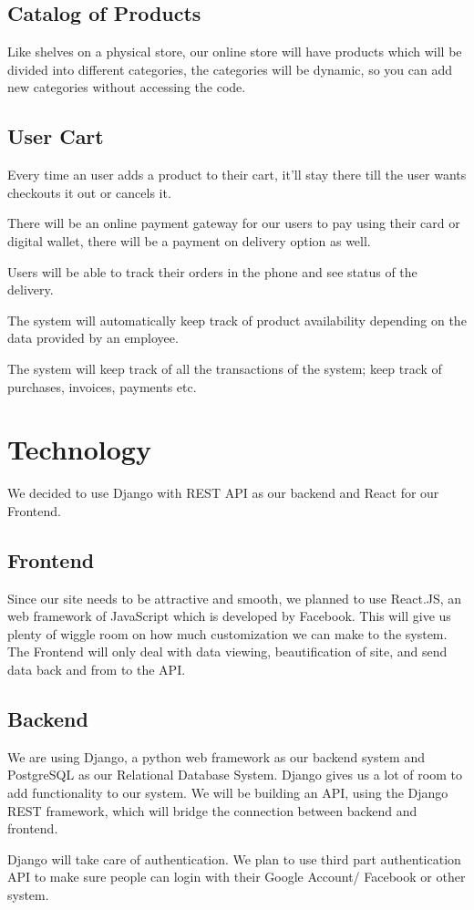 \documentclass[12pt]{article}
\begin{document}
\subsection{Catalog of Products}
Like shelves on a physical store, our online store will have products which will be divided into different categories, the categories will be dynamic, so you can add new categories without accessing the code.

\subsection{User Cart}
Every time an user adds a product to their cart, it'll stay there till the user wants checkouts it out or cancels it.

There will be an online payment gateway for our users to pay using their card or digital wallet, there will be a payment on delivery option as well.

Users will be able to track their orders in the phone and see status of the delivery.

The system will automatically keep track of product availability depending on the data provided by an employee.

The system will keep track of all the transactions of the system; keep track of purchases, invoices, payments etc.

\section{Technology}
We decided to use Django with REST API as our backend and React for our Frontend.

\subsection{Frontend}
Since our site needs to be attractive and smooth, we planned to use React.JS, an web framework of JavaScript which is developed by Facebook. This will give us plenty of wiggle room on how much customization we can make to the system. The Frontend will only deal with data viewing, beautification of site, and send data back and from to the API.

\subsection{Backend}
We are using Django, a python web framework as our backend system and PostgreSQL as our Relational Database System. Django gives us a lot of room to add functionality to our system. We will be building an API, using the Django REST framework, which will bridge the connection between backend and frontend. \par
Django will take care of authentication. We plan to use third part authentication API to make sure people can login with their Google Account/ Facebook or other system.
\end{document}
